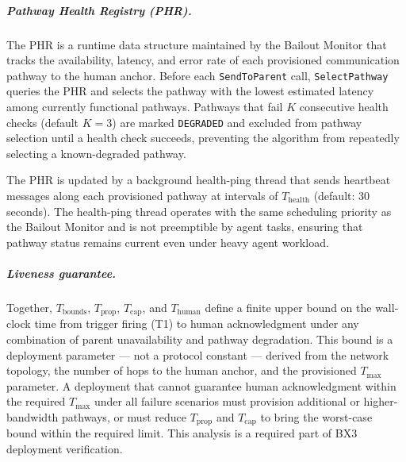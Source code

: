 \subparagraph{Pathway Health Registry (PHR).} The PHR is a runtime data structure maintained by the Bailout Monitor that tracks the availability, latency, and error rate of each provisioned communication pathway to the human anchor. Before each \texttt{SendToParent} call, \texttt{SelectPathway} queries the PHR and selects the pathway with the lowest estimated latency among currently functional pathways. Pathways that fail $K$ consecutive health checks (default $K = 3$) are marked \texttt{DEGRADED} and excluded from pathway selection until a health check succeeds, preventing the algorithm from repeatedly selecting a known-degraded pathway.

The PHR is updated by a background health-ping thread that sends heartbeat messages along each provisioned pathway at intervals of $T_{\text{health}}$ (default: 30 seconds). The health-ping thread operates with the same scheduling priority as the Bailout Monitor and is not preemptible by agent tasks, ensuring that pathway status remains current even under heavy agent workload.

\subparagraph{Liveness guarantee.} Together, $T_{\text{bounds}}$, $T_{\text{prop}}$, $T_{\text{cap}}$, and $T_{\text{human}}$ define a finite upper bound on the wall-clock time from trigger firing (T1) to human acknowledgment under any combination of parent unavailability and pathway degradation. This bound is a deployment parameter — not a protocol constant — derived from the network topology, the number of hops to the human anchor, and the provisioned $T_{\max}$ parameter. A deployment that cannot guarantee human acknowledgment within the required $T_{\max}$ under all failure scenarios must provision additional or higher-bandwidth pathways, or must reduce $T_{\text{prop}}$ and $T_{\text{cap}}$ to bring the worst-case bound within the required limit. This analysis is a required part of BX3 deployment verification.
